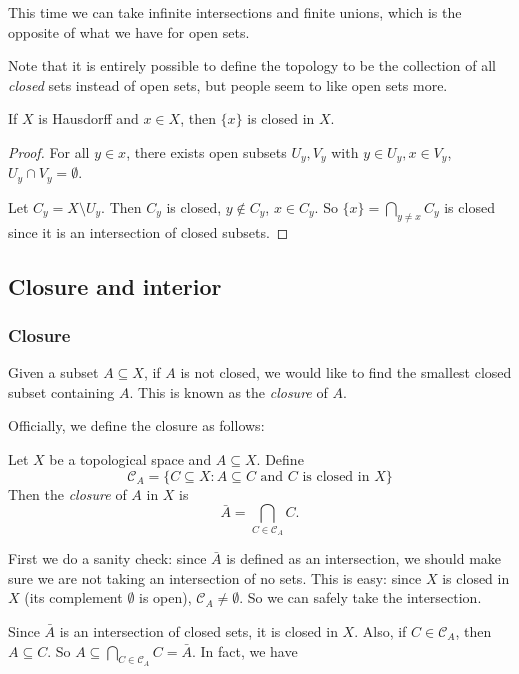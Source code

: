 \documentclass[a4paper]{article}
\begin{document}
This time we can take infinite intersections and finite unions, which is the opposite of what we have for open sets.

Note that it is entirely possible to define the topology to be the collection of all \emph{closed} sets instead of open sets, but people seem to like open sets more.

\begin{cor}
  If $X$ is Hausdorff and $x\in X$, then $\{x\}$ is closed in $X$.
\end{cor}

\begin{proof}
  For all $y\in x$, there exists open subsets $U_y, V_y$ with $y\in U_y, x\in V_y$, $U_y \cap V_y = \emptyset$.

  Let $C_y = X\setminus U_y$. Then $C_y$ is closed, $y\not\in C_y$, $x\in C_y$. So $\{x\} = \bigcap_{y\not= x} C_y$ is closed since it is an intersection of closed subsets.
\end{proof}
\subsection{Closure and interior}
\subsubsection{Closure}
Given a subset $A\subseteq X$, if $A$ is not closed, we would like to find the smallest closed subset containing $A$. This is known as the \emph{closure} of $A$.

Officially, we define the closure as follows:

\begin{defi}[]
  Let $X$ be a topological space and $A\subseteq X$. Define
  \[
    \mathcal{C}_A = \{C\subseteq X: A\subseteq C\text{ and }C\text{ is closed in }X\}
  \]
  Then the \emph{closure} of $A$ in $X$ is
  \[
    \bar A = \bigcap_{C\in \mathcal{C}_A} C.
  \]
\end{defi}
First we do a sanity check: since $\bar A$ is defined as an intersection, we should make sure we are not taking an intersection of no sets. This is easy: since $X$ is closed in $X$ (its complement $\emptyset$ is open), $\mathcal{C}_A \not= \emptyset$. So we can safely take the intersection.

Since $\bar A$ is an intersection of closed sets, it is closed in $X$. Also, if $C\in \mathcal{C}_A$, then $A\subseteq C$. So $A\subseteq \bigcap_{C\in \mathcal{C}_A} C = \bar A$. In fact, we have
\end{document}
